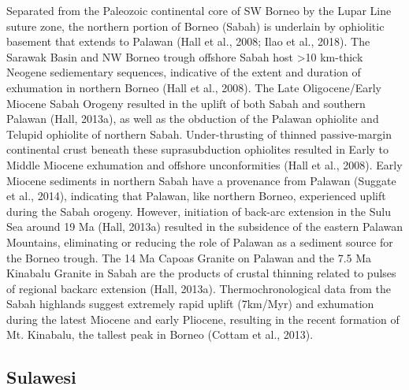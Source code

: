\documentclass[11pt,letterpaper]{article}
\begin{document}
Separated from the Paleozoic continental core of SW Borneo by the Lupar Line suture zone, the northern portion of Borneo (Sabah) is underlain by ophiolitic basement that extends to Palawan (Hall et al., 2008; Ilao et al., 2018). The Sarawak Basin and NW Borneo trough offshore Sabah host >10 km-thick Neogene sediementary sequences, indicative of the extent and duration of exhumation in northern Borneo (Hall et al., 2008). The Late Oligocene/Early Miocene Sabah Orogeny resulted in the uplift of both Sabah and southern Palawan (Hall, 2013a), as well as the obduction of the Palawan ophiolite and Telupid ophiolite of northern Sabah. Under-thrusting of thinned passive-margin continental crust beneath these suprasubduction ophiolites resulted in Early to Middle Miocene exhumation and offshore unconformities (Hall et al., 2008). Early Miocene sediments in northern Sabah have a provenance from Palawan (Suggate et al., 2014), indicating that Palawan, like northern Borneo, experienced uplift during the Sabah orogeny. However, initiation of back-arc extension in the Sulu Sea around 19 Ma (Hall, 2013a) resulted in the subsidence of the eastern Palawan Mountains, eliminating or reducing the role of Palawan as a sediment source for the Borneo trough. The 14 Ma Capoas Granite on Palawan and the 7.5 Ma Kinabalu Granite in Sabah are the products of crustal thinning related to pulses of regional backarc extension (Hall, 2013a). Thermochronological data from the Sabah highlands suggest extremely rapid uplift (7km/Myr) and exhumation during the latest Miocene and early Pliocene, resulting in the recent formation of Mt. Kinabalu, the tallest peak in Borneo (Cottam et al., 2013).

\subsection*{Sulawesi}
\end{document}
